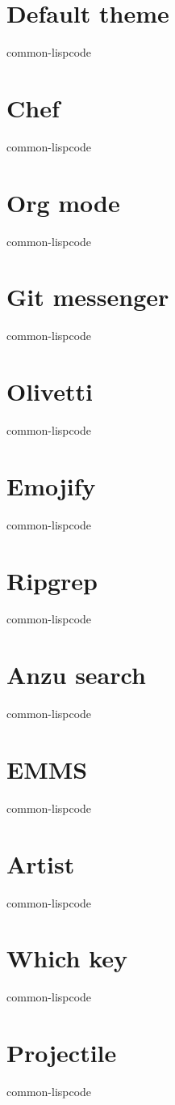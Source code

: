 \documentclass[11pt]{article}
\begin{document}
\section{Default theme}
\label{sec:orga9383cd}
common-lispcode
\section{Chef}
\label{sec:org2d09b9d}
common-lispcode
\section{Org mode}
\label{sec:org6e45230}
common-lispcode
\section{Git messenger}
\label{sec:org652f307}
common-lispcode
\section{Olivetti}
\label{sec:org6adcb1e}
common-lispcode
\section{Emojify}
\label{sec:org0719fd8}
common-lispcode
\section{Ripgrep}
\label{sec:org1255688}
common-lispcode
\section{Anzu search}
\label{sec:orgf8c26f4}
common-lispcode
\section{EMMS}
\label{sec:orgac9e1b5}
common-lispcode
\section{Artist}
\label{sec:orgfbbebb4}
common-lispcode
\section{Which key}
\label{sec:orgf7f97e1}
common-lispcode
\section{Projectile}
\label{sec:orge2889e5}
common-lispcode
\end{document}
